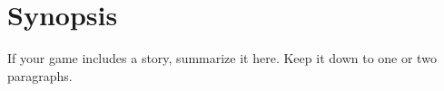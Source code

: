 \section{Synopsis} %
If your game includes a story, summarize it here. Keep it down to one or two
paragraphs.
